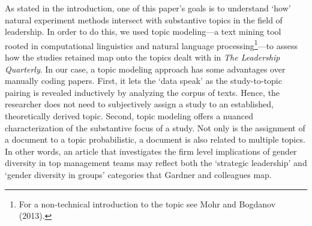 \documentclass[english]{article}
\begin{document}
\noindent As stated in the introduction, one of this paper's goals is to
understand `how' natural experiment methods intersect with substantive
topics in the field of leadership. In order to do this, we used topic
modeling---a text mining tool rooted in computational linguistics and
natural language processing\footnote{For a non-technical introduction to
  the topic see Mohr and Bogdanov (2013).}---to assess how the studies
retained map onto the topics dealt with in \emph{The Leadership
Quarterly}. In our case, a topic modeling approach has some advantages
over manually coding papers. First, it lets the `data speak' as the
study-to-topic pairing is revealed inductively by analyzing the corpus
of texts. Hence, the researcher does not need to subjectively assign a
study to an established, theoretically derived topic. Second, topic
modeling offers a nuanced characterization of the substantive focus of a
study. Not only is the assignment of a document to a topic
probabilistic, a document is also related to multiple topics. In other
words, an article that investigates the firm level implications of
gender diversity in top management teams may reflect both the `strategic
leadership' and `gender diversity in groups' categories that Gardner and
colleagues map.
\end{document}
